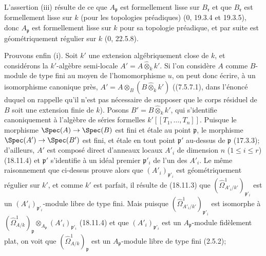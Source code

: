 L'assertion (iii) résulte de ce que $A_{\mathfrak p}$ est formellement lisse sur $B_{\mathfrak r}$ et que $B_{\mathfrak r}$ est formellement lisse sur $k$ (pour les topologies préadiques) (0, 19.3.4 et 19.3.5), donc $A_{\mathfrak p}$ est formellement lisse sur $k$ pour sa topologie préadique, et par suite est géométriquement régulier sur $k$ (0, 22.5.8).

Prouvons enfin (i). Soit $k'$ une extension algébriquement close de $k$, et considérons la $k'$-algèbre semi-locale $A'=A\widehat{\otimes}_k k'$. Si l'on considère $A$ comme $B$-module de type fini au moyen de l'homomorphisme $u$, on peut donc écrire, à un isomorphisme canonique près, $A'=A\otimes_B(B\widehat{\otimes}_k k')$ ((7.5.7.1), dans l'énoncé duquel on rappelle qu'il n'est pas nécessaire de supposer que le corps résiduel de $B$ soit une extension finie de $k$). Posons $B'=B\widehat{\otimes}_k k'$, qui s'identifie canoniquement à l'algèbre de séries formelles $k'[[T_1,\ldots,T_n]]$. Puisque le morphisme $\Spec(A)\to\Spec(B)$ est fini et étale au point $\mathfrak p$, le morphisme $\Spec(A')\to\Spec(B')$ est fini, et étale en tout point $\mathfrak p'$ au-dessus de $\mathfrak p$ (17.3.3); d'ailleurs, $A'$ est composé direct d'anneaux locaux $A'_i$ de dimension $n$ ($1\leq i\leq r$) (18.11.4) et $\mathfrak p'$ s'identifie à un idéal premier $\mathfrak p'_i$ de l'un des $A'_i$. Le même raisonnement que ci-dessus prouve alors que $(A'_i)_{\mathfrak p'_i}$ est géométriquement régulier sur $k'$, et comme $k'$ est parfait, il résulte de (18.11.3) que $(\hat{\Omega}^1_{A'_i/k'})_{\mathfrak p'_i}$ est un $(A'_i)_{\mathfrak p'_i}$-module libre de type fini. Mais puisque $(\hat{\Omega}^1_{A'_i/k'})_{\mathfrak p'_i}$ est isomorphe à $(\hat{\Omega}^1_{A/k})_{\mathfrak p}\otimes_{A_{\mathfrak p}}(A'_i)_{\mathfrak p'_i}$ (18.11.4) et que $(A'_i)_{\mathfrak p'_i}$ est un $A_{\mathfrak p}$-module fidèlement plat, on voit que $(\hat{\Omega}^1_{A/k})_{\mathfrak p}$ est un $A_{\mathfrak p}$-module libre de type fini (2.5.2);

